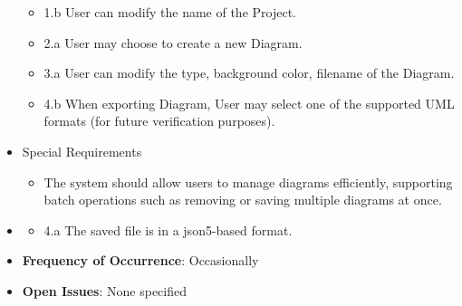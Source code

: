 \documentclass[12pt]{article}
\begin{document}
\begin{itemize}
\begin{itemize}
            \item 1.b User can modify the name of the Project.
            \item 2.a User may choose to create a new Diagram.
            \item 3.a User can modify the type, background color, filename of the Diagram.
            \item 4.b When exporting Diagram, User may select one of the supported UML formats (for future verification purposes).
        \end{itemize}
        \item Special Requirements
        \begin{itemize}
            \item The system should allow users to manage diagrams efficiently, supporting batch operations such as removing or saving multiple diagrams at once.
        \end{itemize}
        \item {}
        \begin{itemize}
            \item 4.a The saved file is in a json5-based format.
        \end{itemize}
        \item \textbf{Frequency of Occurrence}: Occasionally
        \item \textbf{Open Issues}: None specified
    \end{itemize}
\end{document}
